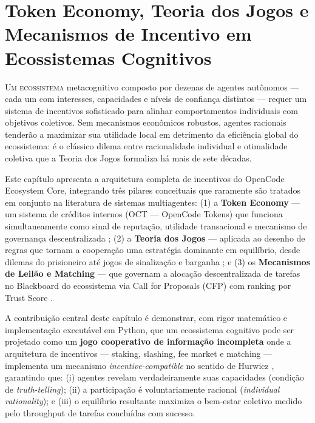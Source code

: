 
\chapter{Token Economy, Teoria dos Jogos e Mecanismos de Incentivo em Ecossistemas Cognitivos}

\lettrine{U}{m ecossistema} metacognitivo composto por dezenas de agentes autônomos --- cada um com interesses, capacidades e níveis de confiança distintos --- requer um sistema de incentivos sofisticado para alinhar comportamentos individuais com objetivos coletivos. Sem mecanismos econômicos robustos, agentes racionais tenderão a maximizar sua utilidade local em detrimento da eficiência global do ecossistema: é o clássico dilema entre racionalidade individual e otimalidade coletiva que a Teoria dos Jogos formaliza há mais de sete décadas.

Este capítulo apresenta a arquitetura completa de incentivos do OpenCode Ecosystem Core, integrando três pilares conceituais que raramente são tratados em conjunto na literatura de sistemas multiagentes: (1) a \textbf{Token Economy} --- um sistema de créditos internos (OCT --- OpenCode Tokens) que funciona simultaneamente como sinal de reputação, utilidade transacional e mecanismo de governança descentralizada \cite{voshmgir2020token, buterin2014ethereum}; (2) a \textbf{Teoria dos Jogos} --- aplicada ao desenho de regras que tornam a cooperação uma estratégia dominante em equilíbrio, desde dilemas do prisioneiro até jogos de sinalização e barganha \cite{nash1950equilibrium, myerson1981optimal, axelrod1984evolution}; e (3) os \textbf{Mecanismos de Leilão e Matching} --- que governam a alocação descentralizada de tarefas no Blackboard do ecossistema via Call for Proposals (CFP) com ranking por Trust Score \cite{vickrey1961counterspeculation, roth1990two}.

A contribuição central deste capítulo é demonstrar, com rigor matemático e implementação executável em Python, que um ecossistema cognitivo pode ser projetado como um \textbf{jogo cooperativo de informação incompleta} onde a arquitetura de incentivos --- staking, slashing, fee market e matching --- implementa um mecanismo \textit{incentive-compatible} no sentido de Hurwicz \cite{hurwicz1973resource}, garantindo que: (i) agentes revelam verdadeiramente suas capacidades (condição de \textit{truth-telling}); (ii) a participação é voluntariamente racional (\textit{individual rationality}); e (iii) o equilíbrio resultante maximiza o bem-estar coletivo medido pelo throughput de tarefas concluídas com sucesso.

